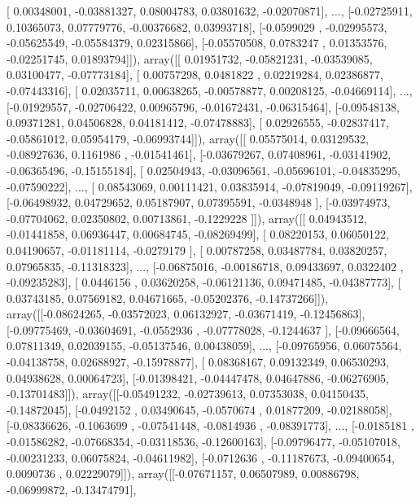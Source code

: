 \documentclass{article}
\begin{document}
       [ 0.00348001, -0.03881327,  0.08004783,  0.03801632, -0.02070871],
       ..., 
       [-0.02725911,  0.10365073,  0.07779776, -0.00376682,  0.03993718],
       [-0.0599029 , -0.02995573, -0.05625549, -0.05584379,  0.02315866],
       [-0.05570508,  0.0783247 ,  0.01353576, -0.02251745,  0.01893794]]), array([[ 0.01951732, -0.05821231, -0.03539085,  0.03100477, -0.07773184],
       [ 0.00757298,  0.0481822 ,  0.02219284,  0.02386877, -0.07443316],
       [ 0.02035711,  0.00638265, -0.00578877,  0.00208125, -0.04669114],
       ..., 
       [-0.01929557, -0.02706422,  0.00965796, -0.01672431, -0.06315464],
       [-0.09548138,  0.09371281,  0.04506828,  0.04181412, -0.07478883],
       [ 0.02926555, -0.02837417, -0.05861012,  0.05954179, -0.06993744]]), array([[ 0.05575014,  0.03129532, -0.08927636,  0.1161986 , -0.01541461],
       [-0.03679267,  0.07408961, -0.03141902, -0.06365496, -0.15155184],
       [ 0.02504943, -0.03096561, -0.05696101, -0.04835295, -0.07590222],
       ..., 
       [ 0.08543069,  0.00111421,  0.03835914, -0.07819049, -0.09119267],
       [-0.06498932,  0.04729652,  0.05187907,  0.07395591, -0.0348948 ],
       [-0.03974973, -0.07704062,  0.02350802,  0.00713861, -0.1229228 ]]), array([[ 0.04943512, -0.01441858,  0.06936447,  0.00684745, -0.08269499],
       [ 0.08220153,  0.06050122,  0.04190657, -0.01181114, -0.0279179 ],
       [ 0.00787258,  0.03487784,  0.03820257,  0.07965835, -0.11318323],
       ..., 
       [-0.06875016, -0.00186718,  0.09433697,  0.0322402 , -0.09235283],
       [ 0.0446156 ,  0.03620258, -0.06121136,  0.09471485, -0.04387773],
       [ 0.03743185,  0.07569182,  0.04671665, -0.05202376, -0.14737266]]), array([[-0.08624265, -0.03572023,  0.06132927, -0.03671419, -0.12456863],
       [-0.09775469, -0.03604691, -0.0552936 , -0.07778028, -0.1244637 ],
       [-0.09666564,  0.07811349,  0.02039155, -0.05137546,  0.00438059],
       ..., 
       [-0.09765956,  0.06075564, -0.04138758,  0.02688927, -0.15978877],
       [ 0.08368167,  0.09132349,  0.06530293,  0.04938628,  0.00064723],
       [-0.01398421, -0.04447478,  0.04647886, -0.06276905, -0.13701483]]), array([[-0.05491232, -0.02739613,  0.07353038,  0.04150435, -0.14872045],
       [-0.0492152 ,  0.03490645, -0.0570674 ,  0.01877209, -0.02188058],
       [-0.08336626, -0.1063699 , -0.07541448, -0.0814936 , -0.08391773],
       ..., 
       [-0.0185181 , -0.01586282, -0.07668354, -0.03118536, -0.12600163],
       [-0.09796477, -0.05107018, -0.00231233,  0.06075824, -0.04611982],
       [-0.0712636 , -0.11187673, -0.09400654,  0.0090736 ,  0.02229079]]), array([[-0.07671157,  0.06507989,  0.00886798, -0.06999872, -0.13474791],
\end{document}
